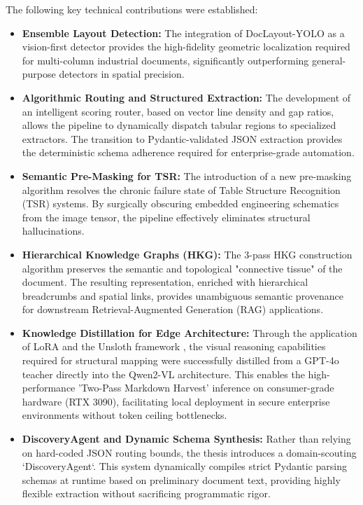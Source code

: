 The following key technical contributions were established:
\begin{itemize}
    \item \textbf{Ensemble Layout Detection:} The integration of DocLayout-YOLO as a vision-first detector provides the high-fidelity geometric localization required for multi-column industrial documents, significantly outperforming general-purpose detectors in spatial precision.
    
    \item \textbf{Algorithmic Routing and Structured Extraction:} The development of an intelligent scoring router, based on vector line density and gap ratios, allows the pipeline to dynamically dispatch tabular regions to specialized extractors. The transition to Pydantic-validated JSON extraction provides the deterministic schema adherence required for enterprise-grade automation.
    
    \item \textbf{Semantic Pre-Masking for TSR:} The introduction of a new pre-masking algorithm resolves the chronic failure state of Table Structure Recognition (TSR) systems. By surgically obscuring embedded engineering schematics from the image tensor, the pipeline effectively eliminates structural hallucinations.
    
    \item \textbf{Hierarchical Knowledge Graphs (HKG):} The 3-pass HKG construction algorithm preserves the semantic and topological "connective tissue" of the document. The resulting representation, enriched with hierarchical breadcrumbs and spatial links, provides unambiguous semantic provenance for downstream Retrieval-Augmented Generation (RAG) applications.
    
    \item \textbf{Knowledge Distillation for Edge Architecture:} Through the application of LoRA \citep{lora} and the Unsloth framework \citep{unsloth}, the visual reasoning capabilities required for structural mapping were successfully distilled from a GPT-4o \citep{gpt4v} teacher directly into the Qwen2-VL architecture. This enables the high-performance 'Two-Pass Markdown Harvest' inference on consumer-grade hardware (RTX 3090), facilitating local deployment in secure enterprise environments without token ceiling bottlenecks.
    
    \item \textbf{DiscoveryAgent and Dynamic Schema Synthesis:} Rather than relying on hard-coded JSON routing bounds, the thesis introduces a domain-scouting `DiscoveryAgent`. This system dynamically compiles strict Pydantic parsing schemas at runtime based on preliminary document text, providing highly flexible extraction without sacrificing programmatic rigor.
\end{itemize}

